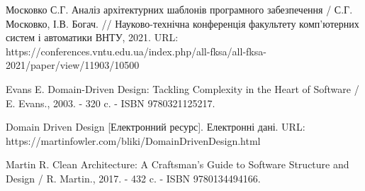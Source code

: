 \begingroup
\renewcommand{\section}[2]{\anonsection{Перелік джерел}}
\begin{thebibliography}{00}

      Московко С.Г.
      Аналіз архітектурних шаблонів програмного забезпечення /
      С.Г. Московко, І.В. Богач. //
      Науково-технічна конференція факультету комп'ютерних систем і автоматики
      ВНТУ, 2021.
      URL: https://conferences.vntu.edu.ua/index.php/all-fksa/all-fksa-2021/paper/view/11903/10500

      Evans E.
      Domain-Driven Design: Tackling Complexity in the Heart of Software /
      E. Evans., 2003. - 320 c. - ISBN 9780321125217.

      Domain Driven Design
      [Електронний ресурс]. Електронні дані.
      URL: https://martinfowler.com/bliki/DomainDrivenDesign.html
	
			Martin R.
			Clean Architecture: A Craftsman's Guide to Software Structure and Design /
			R. Martin., 2017. - 432 c. - ISBN 9780134494166.

\end{thebibliography}
\endgroup

\clearpage
